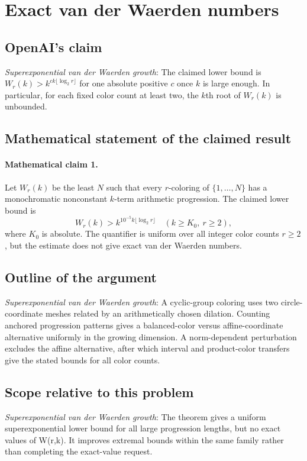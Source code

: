 \documentclass[11pt]{article}
\begin{document}
\section*{Exact van der Waerden numbers}

\subsection{OpenAI's claim}
\textit{Superexponential van der Waerden growth}: The claimed lower bound is $W_r(k)>k^{ck\lfloor\log_2 r\rfloor}$ for one absolute positive $c$ once $k$ is large enough. In particular, for each fixed color count at least two, the $k$th root of $W_r(k)$ is unbounded.

\subsection{Mathematical statement of the claimed result}
\paragraph{Mathematical claim 1.} Let $W_r(k)$ be the least $N$ such that every $r$-coloring of $\{1,\ldots,N\}$ has a monochromatic nonconstant $k$-term arithmetic progression. The claimed lower bound is \[W_r(k)>k^{10^{-5}k\lfloor\log_2r\rfloor}\quad(k\ge K_0,\ r\ge2),\] where $K_0$ is absolute. The quantifier is uniform over all integer color counts $r\ge2$, but the estimate does not give exact van der Waerden numbers.

\subsection{Outline of the argument}
\textit{Superexponential van der Waerden growth}: A cyclic-group coloring uses two circle-coordinate meshes related by an arithmetically chosen dilation. Counting anchored progression patterns gives a balanced-color versus affine-coordinate alternative uniformly in the growing dimension. A norm-dependent perturbation excludes the affine alternative, after which interval and product-color transfers give the stated bounds for all color counts.

\subsection{Scope relative to this problem}
\textit{Superexponential van der Waerden growth}: The theorem gives a uniform superexponential lower bound for all large progression lengths, but no exact values of W(r,k). It improves extremal bounds within the same family rather than completing the exact-value request.
\end{document}
